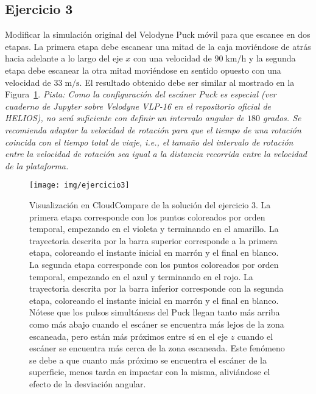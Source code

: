 \documentclass[]{article}
\begin{document}
	\subsection*{Ejercicio 3}
	Modificar la simulación original del Velodyne Puck móvil para que escanee en dos etapas. La primera etapa debe escanear una mitad de la caja moviéndose de atrás hacia adelante a lo largo del eje $x$ con una velocidad de $90\;\mathrm{km}/\mathrm{h}$ y la segunda etapa debe escanear la otra mitad moviéndose en sentido opuesto con una velocidad de $33\;\mathrm{m}/\mathrm{s}$. El resultado obtenido debe ser similar al mostrado en la Figura~\ref{fig:ejercicio3}. \textit{Pista: Como la configuración del escáner Puck es especial (ver cuaderno de Jupyter sobre Velodyne VLP-16 en el repositorio oficial de HELIOS), no será suficiente con definir un intervalo angular de $180$ grados. Se recomienda adaptar la velocidad de rotación para que el tiempo de una rotación coincida con el tiempo total de viaje, i.e., el tamaño del intervalo de rotación entre la velocidad de rotación sea igual a la distancia recorrida entre la velocidad de la plataforma.}
	
	\begin{figure}[htb]
		\centering
		\texttt{[image: img/ejercicio3]}
		\caption{Visualización en CloudCompare de la solución del ejercicio 3. La primera etapa corresponde con los puntos coloreados por orden temporal, empezando en el violeta y terminando en el amarillo. La trayectoria descrita por la barra superior corresponde a la primera etapa, coloreando el instante inicial en marrón y el final en blanco. La segunda etapa corresponde con los puntos coloreados por orden temporal, empezando en el azul y terminando en el rojo. La trayectoria descrita por la barra inferior corresponde con la segunda etapa, coloreando el instante inicial en marrón y el final en blanco. Nótese que los pulsos simultáneas del Puck llegan tanto más arriba como más abajo cuando el escáner se encuentra más lejos de la zona escaneada, pero están más próximos entre sí en el eje $z$ cuando el escáner se encuentra más cerca de la zona escaneada. Este fenómeno se debe a que cuanto más próximo se encuentra el escáner de la superficie, menos tarda en impactar con la misma, aliviándose el efecto de la desviación angular.}
		\label{fig:ejercicio3}
	\end{figure} 


	\pagebreak
	
\end{document}

